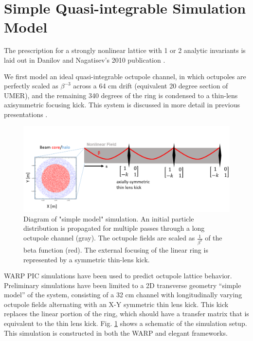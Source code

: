 \section{Simple Quasi-integrable Simulation Model}

The prescription for a strongly nonlinear lattice with 1 or 2 analytic invariants is laid out in Danilov and Nagatisev's 2010 publication \cite{Danilov2010}.

We first model an ideal quasi-integrable octupole channel, in which octupoles are perfectly scaled as $\beta^{-3}$ across a 64 cm drift (equivalent 20 degree section of UMER), and the remaining 340 degrees of the ring is condensed to a thin-lens axisymmetric focusing kick. This system is discussed in more detail in previous presentations \cite{KRAAC}.


\begin{figure}[]
   \centering
    \includegraphics[width=\textwidth]{7.figures/toy-model-simulation-diagram.png}
 	\caption{Diagram of "simple model" simulation. An initial particle distribution is propagated for multiple passes through a long octupole channel (gray). The octupole fields are scaled as $\frac{1}{\beta^3}$ of the beta function (red). The external focusing of the linear ring is represented by a symmetric thin-lens kick.}
   \label{fig:toy-model-diagram}
\end{figure}

WARP PIC simulations have been used to predict octupole lattice behavior. Preliminary simulations have been limited to a 2D transverse geometry “simple model” of the system, consisting of a 32 cm channel with longitudinally varying octupole fields alternating with an X-Y symmetric thin lens kick. This kick replaces the linear portion of the ring, which should have a transfer matrix that is equivalent to the thin lens kick. Fig. \ref{fig:toy-model-diagram} shows a schematic of the simulation setup. This simulation is constructed in both the WARP and elegant frameworks. 

